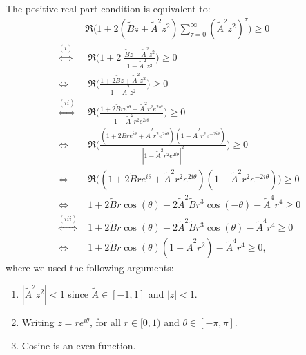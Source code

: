 
The positive real part condition is equivalent to:
\begin{align*}
&\Re\Big( 1+ 2(\tilde{B}z + \tilde{A}^2z^2) \sum_{\tau=0}^{\infty}(\tilde{A}^2z^2)^\tau \Big)  \geq 0\\
\overset{(i)}{\iff }& \; \Re\Big( 1+ 2\; \frac{\tilde{B}z + \tilde{A}^2z^2}{1-\tilde{A}^2z^2} \Big) \geq 0\\
\iff & \; \Re\Big( \frac{1 + 2\tilde{B}z + \tilde{A}^2z^2}{1-\tilde{A}^2z^2} \Big)  \geq 0\\
\overset{(ii)}{\iff}& \; \Re\Big( \frac{1 + 2\tilde{B}re^{i\theta} + \tilde{A}^2r^2e^{2i\theta}}{1-\tilde{A}^2r^2e^{2i\theta}} \Big) \geq 0\\
\iff & \; \Re\Big( \frac{(1 + 2\tilde{B}re^{i\theta} + \tilde{A}^2r^2e^{2i\theta})(1-\tilde{A}^2r^2e^{-2i\theta})}{|1-\tilde{A}^2r^2e^{2i\theta}|^2} \Big) \geq 0\\
\iff & \; \Re\Big( (1 + 2\tilde{B}re^{i\theta} + \tilde{A}^2r^2e^{2i\theta})(1-\tilde{A}^2r^2e^{-2i\theta}) \Big) \geq 0\\
  \iff & \; 1 + 2\tilde{B}r\cos(\theta) - 2\tilde{A}^2\tilde{B}r^3\cos(-\theta) - \tilde{A}^4r^4 \geq 0\\
  \overset{(iii)}{\iff} & \; 1 + 2\tilde{B}r\cos(\theta) - 2\tilde{A}^2\tilde{B}r^3\cos(\theta) - \tilde{A}^4r^4 \geq 0\\
  \iff & \; 1 + 2\tilde{B}r\cos(\theta)(1-\tilde{A}^2r^2) - \tilde{A}^4r^4 \geq 0  \text{, }
\end{align*}
where we used the following arguments:
\begin{enumerate}[label=(\roman*)]
\item $|\tilde{A}^2z^2|<1$ since $\tilde{A}\in [-1, 1]$ and $|z|<1$.
\item Writing $z = re^{i\theta}$, for all $r \in [0, 1)$ and $\theta \in [-\pi, \pi]$.
\item Cosine is an even function.
\end{enumerate}

